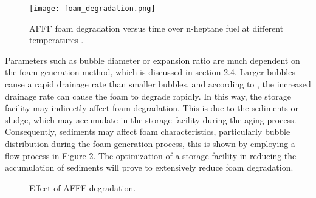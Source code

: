 \begin{figure}[H]
    \centering
    \texttt{[image: foam\_degradation.png]}
    \caption{AFFF foam degradation versus time over n-heptane fuel at different temperatures \cite{hinnant2017influence}.}
    \label{ch2:figure:degradation}
\end{figure}

Parameters such as bubble diameter or expansion ratio are much dependent on the foam generation method, which is discussed in section 2.4. Larger bubbles cause a rapid drainage rate than smaller bubbles, and according to \cite{hinnant2017influence}, the increased drainage rate can cause the foam to degrade rapidly. In this way, the storage facility may indirectly affect foam degradation. This is due to the sediments or sludge, which may accumulate in the storage facility during the aging process. Consequently, sediments may affect foam characteristics, particularly bubble distribution during the foam generation process, this is shown by employing a flow process in Figure \ref{ch2:figure:effect}. The optimization of a storage facility in reducing the accumulation of sediments will prove to extensively reduce foam degradation.

\begin{figure}[H]

\centering
\begin{adjustbox}{center}
\end{adjustbox}

\caption{Effect of AFFF degradation.}
\label{ch2:figure:effect}
\end{figure}

